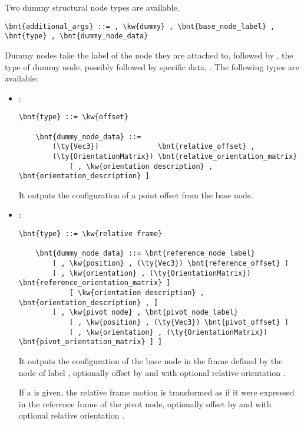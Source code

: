 Two dummy structural node types are available.
\begin{Verbatim}[commandchars=\\\{\}]
    \bnt{additional_args} ::= , \kw{dummy} , \bnt{base_node_label} , \bnt{type} , \bnt{dummy_node_data}
\end{Verbatim}

Dummy nodes take the label  of the node they are attached to, 
followed by , the type of dummy node, possibly followed by specific data,
.
The following types are available:

\begin{itemize}
    \item {}:
\begin{Verbatim}[commandchars=\\\{\}]
    \bnt{type} ::= \kw{offset}

    \bnt{dummy_node_data} ::=
        (\ty{Vec3})              \bnt{relative_offset} ,
        (\ty{OrientationMatrix}) \bnt{relative_orientation_matrix}
            [ , \kw{orientation description} , \bnt{orientation_description} ]
\end{Verbatim}
    It outputs the configuration of a point offset from the base node.
            
    \item {}:
\begin{Verbatim}[commandchars=\\\{\}]
    \bnt{type} ::= \kw{relative frame}

    \bnt{dummy_node_data} ::= \bnt{reference_node_label}
        [ , \kw{position} , (\ty{Vec3}) \bnt{reference_offset} ]
        [ , \kw{orientation} , (\ty{OrientationMatrix}) \bnt{reference_orientation_matrix} ]
            [ \kw{orientation description} , \bnt{orientation_description} , ]
        [ , \kw{pivot node} , \bnt{pivot_node_label}
            [ , \kw{position} , (\ty{Vec3}) \bnt{pivot_offset} ]
            [ , \kw{orientation} , (\ty{OrientationMatrix}) \bnt{pivot_orientation_matrix} ] ]
\end{Verbatim}
    It outputs the configuration of the base node in the frame defined
    by the node of label , optionally offset 
    by  and with optional relative orientation 
    .

    If a  is given, the relative frame motion
    is transformed as if it were expressed in the reference frame
    of the pivot node, optionally offset by 
    and with optional relative orientation .
\end{itemize}

